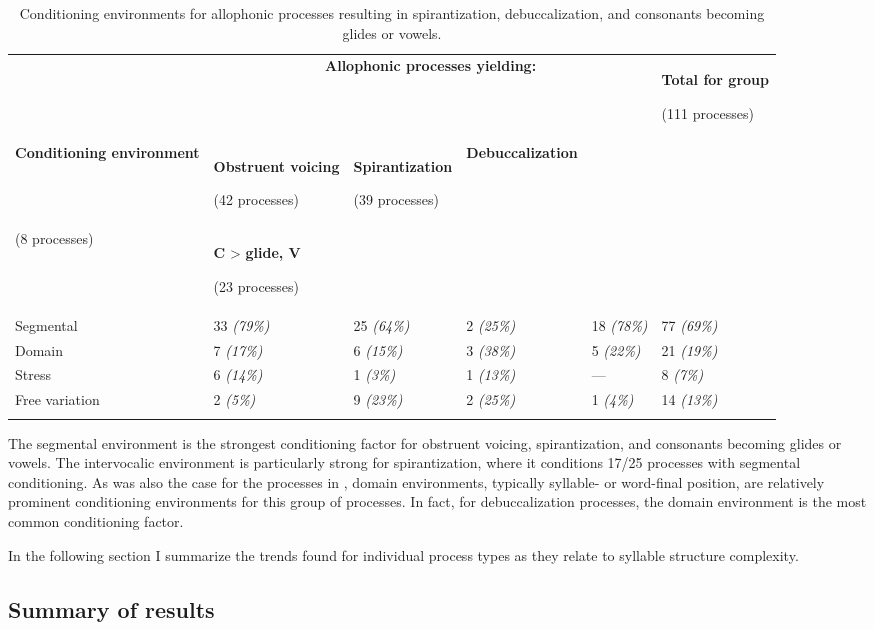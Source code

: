 \begin{table}
\begin{tabularx}{\textwidth}{XXXXXX}
\lsptoprule
 & \multicolumn{4}{c}{ \textbf{Allophonic processes yielding:}} & { \textbf{Total for group}}

 (111 processes)\\
 \textbf{Conditioning environment} & { \textbf{Obstruent voicing}}

 (42 processes) & { \textbf{Spirantization}}

 (39 processes) & \textbf{Debuccalization}\\
(8 processes) & { \textbf{C} > \textbf{glide, V}}

 (23 processes) & \\
 Segmental & 33 \textit{(79\%)} & 25 \textit{(64\%)} & 2 \textit{(25\%)} & 18 \textit{(78\%)} & 77 \textit{(69\%)}\\
 Domain & 7 \textit{(17\%)} & 6 \textit{(15\%)} & 3 \textit{(38\%)} & 5 \textit{(22\%)} & 21 \textit{(19\%)}\\
 Stress & 6 \textit{(14\%)} & 1 \textit{(3\%)} & 1 \textit{(13\%)} & — & 8 \textit{(7\%)}\\
 Free variation & 2 \textit{(5\%)} & 9 \textit{(23\%)} & 2 \textit{(25\%)} & 1 \textit{(4\%)} & 14 \textit{(13\%)}\\
\lspbottomrule
\end{tabularx}
\caption{\label{tab:7.6}Conditioning environments for allophonic processes resulting in spirantization, debuccalization, and consonants becoming glides or vowels.}
\end{table}

  The segmental environment is the strongest conditioning factor for obstruent voicing, spirantization, and consonants becoming glides or vowels. The intervocalic environment is particularly strong for spirantization, where it conditions 17/25 processes with segmental conditioning. As was also the case for the processes in , domain environments, typically syllable- or word-final position, are relatively prominent conditioning environments for this group of processes. In fact, for debuccalization processes, the domain environment is the most common conditioning factor.

  In the following section I summarize the trends found for individual process types as they relate to syllable structure complexity.

\subsection{Summary of results} \label{sec:7.3.7}


